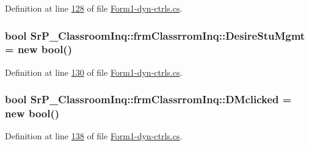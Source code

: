 \-Definition at line \hyperlink{_form1-dyn-ctrls_8cs_source_l00128}{128} of file \hyperlink{_form1-dyn-ctrls_8cs_source}{\-Form1-\/dyn-\/ctrls.\-cs}.

\hypertarget{class_sr_p___classroom_inq_1_1frm_classrrom_inq_acc0266ba1df8a99c08f9f4ad95c01252}{
\subsubsection[{\-Desire\-Stu\-Mgmt}]{\setlength{\rightskip}{0pt plus 5cm}bool {\bf \-Sr\-P\-\_\-\-Classroom\-Inq\-::frm\-Classrrom\-Inq\-::\-Desire\-Stu\-Mgmt} = new bool()}}
\label{class_sr_p___classroom_inq_1_1frm_classrrom_inq_acc0266ba1df8a99c08f9f4ad95c01252}


\-Definition at line \hyperlink{_form1-dyn-ctrls_8cs_source_l00130}{130} of file \hyperlink{_form1-dyn-ctrls_8cs_source}{\-Form1-\/dyn-\/ctrls.\-cs}.

\hypertarget{class_sr_p___classroom_inq_1_1frm_classrrom_inq_a663c3385393ae39a41bd647632ba4617}{
\subsubsection[{\-D\-Mclicked}]{\setlength{\rightskip}{0pt plus 5cm}bool {\bf \-Sr\-P\-\_\-\-Classroom\-Inq\-::frm\-Classrrom\-Inq\-::\-D\-Mclicked} = new bool()}}
\label{class_sr_p___classroom_inq_1_1frm_classrrom_inq_a663c3385393ae39a41bd647632ba4617}


\-Definition at line \hyperlink{_form1-dyn-ctrls_8cs_source_l00138}{138} of file \hyperlink{_form1-dyn-ctrls_8cs_source}{\-Form1-\/dyn-\/ctrls.\-cs}.

